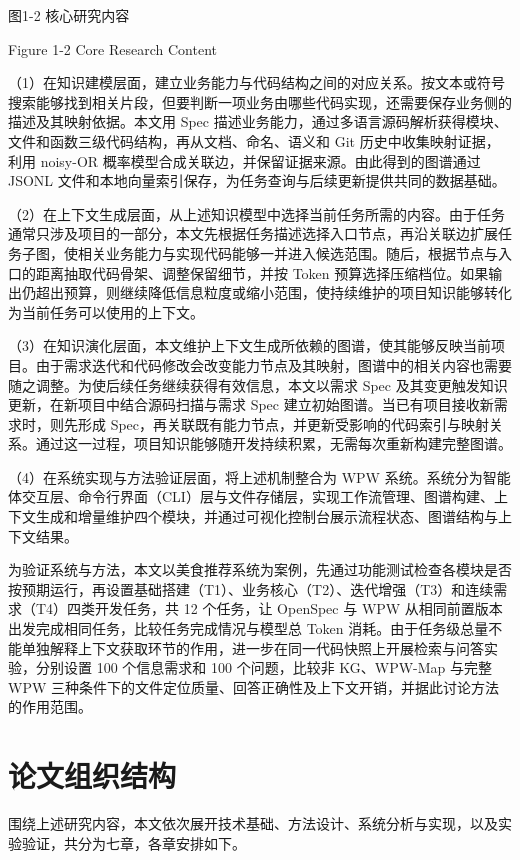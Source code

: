 图1-2 核心研究内容

Figure 1-2 Core Research Content

（1）在知识建模层面，建立业务能力与代码结构之间的对应关系。按文本或符号搜索能够找到相关片段，但要判断一项业务由哪些代码实现，还需要保存业务侧的描述及其映射依据。本文用 Spec 描述业务能力，通过多语言源码解析获得模块、文件和函数三级代码结构，再从文档、命名、语义和 Git 历史中收集映射证据，利用 noisy-OR 概率模型合成关联边，并保留证据来源。由此得到的图谱通过 JSONL 文件和本地向量索引保存，为任务查询与后续更新提供共同的数据基础。

（2）在上下文生成层面，从上述知识模型中选择当前任务所需的内容。由于任务通常只涉及项目的一部分，本文先根据任务描述选择入口节点，再沿关联边扩展任务子图，使相关业务能力与实现代码能够一并进入候选范围。随后，根据节点与入口的距离抽取代码骨架、调整保留细节，并按 Token 预算选择压缩档位。如果输出仍超出预算，则继续降低信息粒度或缩小范围，使持续维护的项目知识能够转化为当前任务可以使用的上下文。

（3）在知识演化层面，本文维护上下文生成所依赖的图谱，使其能够反映当前项目。由于需求迭代和代码修改会改变能力节点及其映射，图谱中的相关内容也需要随之调整。为使后续任务继续获得有效信息，本文以需求 Spec 及其变更触发知识更新，在新项目中结合源码扫描与需求 Spec 建立初始图谱。当已有项目接收新需求时，则先形成 Spec，再关联既有能力节点，并更新受影响的代码索引与映射关系。通过这一过程，项目知识能够随开发持续积累，无需每次重新构建完整图谱。

（4）在系统实现与方法验证层面，将上述机制整合为 WPW 系统。系统分为智能体交互层、命令行界面（CLI）层与文件存储层，实现工作流管理、图谱构建、上下文生成和增量维护四个模块，并通过可视化控制台展示流程状态、图谱结构与上下文结果。

为验证系统与方法，本文以美食推荐系统为案例，先通过功能测试检查各模块是否按预期运行，再设置基础搭建（T1）、业务核心（T2）、迭代增强（T3）和连续需求（T4）四类开发任务，共 12 个任务，让 OpenSpec 与 WPW 从相同前置版本出发完成相同任务，比较任务完成情况与模型总 Token 消耗。由于任务级总量不能单独解释上下文获取环节的作用，进一步在同一代码快照上开展检索与问答实验，分别设置 100 个信息需求和 100 个问题，比较非 KG、WPW-Map 与完整 WPW 三种条件下的文件定位质量、回答正确性及上下文开销，并据此讨论方法的作用范围。


\section{论文组织结构}
围绕上述研究内容，本文依次展开技术基础、方法设计、系统分析与实现，以及实验验证，共分为七章，各章安排如下。

